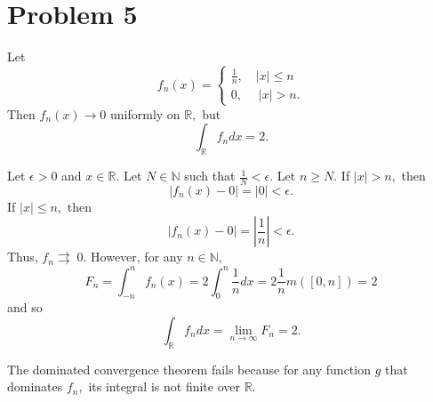 \documentclass[11pt]{article}
\newcommand{\bbN}{\mathbb{N}}
\newcommand{\bbR}{\mathbb{R}}
\begin{document}
\newpage
\section*{Problem 5}
\begin{problem}
    Let 
    \[f_n(x) = \begin{cases}
        \frac{1}{n}, \quad |x| \leq n\\
        0, \quad \;|x| >n.
    \end{cases}\]
    Then $f_n(x) \to 0$ uniformly on $\bbR,$ but 
    \[\int_\bbR f_n dx = 2.\]
\end{problem}
\begin{solution}
    Let $\epsilon>0$ and $x\in \bbR.$ Let $N \in \bbN$ such that $\frac{1}{N}< \epsilon.$ Let $n \geq N.$ If $|x| > n,$ then 
    \[|f_n(x) - 0| = |0| < \epsilon.\]
    If $|x|\leq n,$ then 
    \[|f_n(x) - 0| = |\frac{1}{n}| < \epsilon.\] Thus, 
    $f_n{\rightrightarrows} \;0.$ However, 
    for any $n \in \bbN,$ 
    \[F_n = \int_{-n}^n f_n(x) = 2\int_0^n \frac{1}{n}dx = 2\frac{1}{n}m([0,n]) = 2\] and so 
    \[\int_\bbR f_n dx = \lim_{n\to \infty}F_n = 2.\]

    The dominated convergence theorem fails because for any function $g$ that dominates $f_n,$ its integral is not finite over $\bbR.$ 
\end{solution}



\newpage
\end{document}
